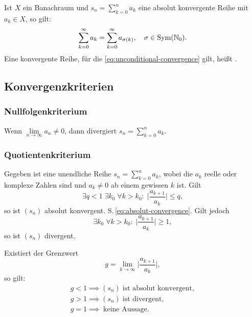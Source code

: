 Ist $X$ ein Banachraum und $s_n=\sum_{k=0}^n a_k$ eine
absolut konvergente Reihe mit $a_k\in X$, so gilt:
\begin{equation}\label{eq:unconditional-convergence}
\sum_{k=0}^\infty a_k = \sum_{k=0}^\infty a_{\sigma(k)},\quad
\sigma\in\operatorname{Sym}(\mathbb N_0).
\end{equation}
Eine konvergente Reihe, für die \eqref{eq:unconditional-convergence}
gilt, heißt .

\subsection{Konvergenzkriterien}
\subsubsection{Nullfolgenkriterium}
Wenn $\lim\limits_{n\to\infty}a_n\ne 0$, dann divergiert $s_n=\sum\limits_{k=0}^n a_k$.

\subsubsection{Quotientenkriterium}
Gegeben ist eine unendliche Reihe $s_n=\sum_{k=0}^n a_k$, wobei
die $a_k$ reelle oder komplexe Zahlen sind und $a_k\ne 0$ ab einem
gewissen $k$ ist. Gilt
\begin{equation}
\exists q{<}1\;\exists k_0\;\forall k{>}k_0\colon\;\Big|\frac{a_{k+1}}{a_k}\Big|\le q,
\end{equation}
so ist $(s_n)$ absolut konvergent. S.\,\eqref{eq:absolut-convergence}.
Gilt jedoch
\begin{equation}
\exists k_0\;\forall k{>}k_0\colon\;\Big|\frac{a_{k+1}}{a_k}\Big|\ge 1,
\end{equation}
so ist $(s_n)$ divergent.

Existiert der Grenzwert
\begin{equation}
g = \lim_{k\to\infty}\Big|\frac{a_{k+1}}{a_k}\Big|,
\end{equation}
so gilt:
\begin{gather}
g<1\implies(s_n)\;\text{ist absolut konvergent},\\
g>1\implies(s_n)\;\text{ist divergent},\\
g=1\implies\;\text{keine Aussage}.
\end{gather}

